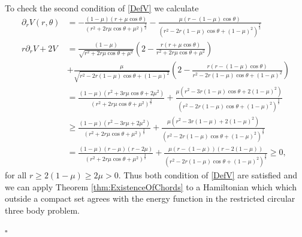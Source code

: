 \documentclass[a4paper]{amsart}
\numberwithin{equation}{section}
\begin{document}
To check the second condition of \eqref{DefV} we calculate
\begin{align*}
\partial_r V(r,\theta) & = -\frac{(1-\mu)(r+\mu \cos \theta)}{\left(r^2+2r\mu \cos \theta +\mu^2\right)^{\frac{3}{2}}}-\frac{\mu (r-(1-\mu)\cos \theta)}{\left(r^2-2r(1-\mu) \cos \theta +(1-\mu)^2\right)^{\frac{3}{2}}}\\
r \partial_r V+2V & = \frac{(1-\mu)}{\sqrt{r^2+2r\mu \cos \theta +\mu^2}}\left( 2 - \frac{r(r+\mu \cos \theta)}{r^2+2r\mu \cos \theta +\mu^2}\right)\\
& + \frac{\mu}{\sqrt{r^2-2r(1-\mu) \cos \theta +(1-\mu)^2}}\left( 2 - \frac{r(r-(1-\mu)\cos \theta)}{r^2-2r(1-\mu) \cos \theta +(1-\mu)^2}\right)\\
& = \frac{(1-\mu)\left(r^2+3r\mu \cos\theta + 2 \mu^2 \right)}{\left(r^2+2r\mu \cos \theta +\mu^2\right)^{\frac{3}{2}}}+\frac{\mu (r^2-3 r (1-\mu)\cos\theta + 2 (1-\mu)^2)}{\left(r^2-2r(1-\mu) \cos \theta +(1-\mu)^2\right)^{\frac{3}{2}}}\\
& \geq \frac{(1-\mu)\left(r^2-3r\mu + 2 \mu^2 \right)}{\left(r^2+2r\mu \cos \theta +\mu^2\right)^{\frac{3}{2}}}+\frac{\mu (r^2-3 r (1-\mu) + 2 (1-\mu)^2)}{\left(r^2-2r(1-\mu) \cos \theta +(1-\mu)^2\right)^{\frac{3}{2}}}\\
& = \frac{(1-\mu)(r-\mu)( r-2 \mu )}{\left(r^2+2r\mu \cos \theta +\mu^2\right)^{\frac{3}{2}}}+\frac{\mu (r-(1-\mu))(r - 2 (1-\mu))}{\left(r^2-2r(1-\mu) \cos \theta +(1-\mu)^2\right)^{\frac{3}{2}}}\geq 0,
\end{align*}
for all $r\geq 2(1-\mu)\geq 2\mu>0$. Thus both condition of \eqref{DefV} are satisfied and we can apply Theorem \ref{thm:ExistenceOfChords} to a Hamiltonian which which outside a compact set agrees with the energy function in the restricted circular three body problem.

\hfill $\square$

\printbibliography
\end{document}
